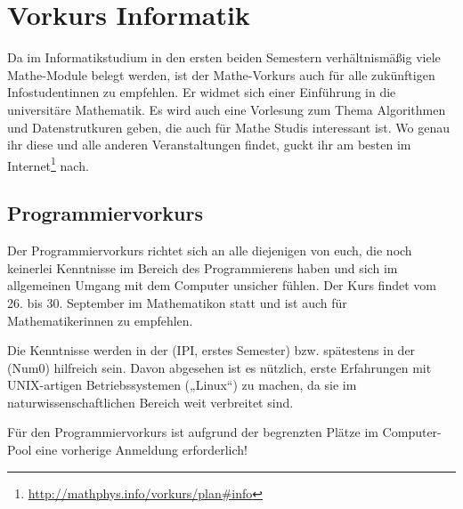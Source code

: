 \section{Vorkurs Informatik}
Da im Informatikstudium in den ersten beiden Semestern verhältnismäßig viele Mathe-Module belegt werden, ist der Mathe-Vorkurs auch für alle zukünftigen Infostudentinnen zu empfehlen. Er widmet sich einer Einführung in die universitäre Mathematik.
Es wird auch eine Vorlesung zum Thema Algorithmen und Datenstrutkuren geben, die auch für Mathe Studis interessant ist. Wo genau ihr diese und alle anderen Veranstaltungen findet, guckt ihr am besten im Internet\footnote{\url{http://mathphys.info/vorkurs/plan\#info}} nach.%


\subsection{Programmiervorkurs}
Der Programmiervorkurs richtet sich an alle diejenigen von euch, die noch keinerlei Kenntnisse im Bereich des Programmierens haben und sich im allgemeinen Umgang mit dem Computer unsicher fühlen. Der Kurs findet vom 26. bis 30. September im Mathematikon statt und ist auch für Mathematikerinnen zu empfehlen.

Die Kenntnisse werden in der  (\gls{IPI}, erstes Semester) bzw. spätestens in der  (\gls{Num0}) hilfreich sein. Davon abgesehen ist es nützlich, erste Erfahrungen mit UNIX-artigen Betriebssystemen („Linux“) zu machen, da sie im naturwissenschaftlichen Bereich weit verbreitet sind.

Für den Programmiervorkurs ist aufgrund der begrenzten Plätze im Computer-Pool eine vorherige Anmeldung erforderlich!

